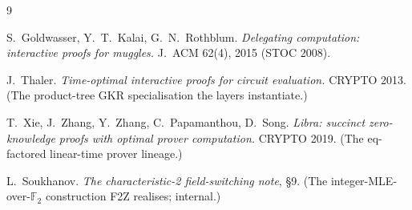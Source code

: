 \documentclass[11pt]{article}
\newcommand{\F}{\mathbb{F}}
\newcommand{\Ftwo}{\F_2}
\theoremstyle{definition}
\begin{document}
\begin{thebibliography}{9}\small

 S.~Goldwasser, Y.~T.~Kalai, G.~N.~Rothblum.
\emph{Delegating computation: interactive proofs for muggles.}
J.~ACM 62(4), 2015 (STOC 2008).

 J.~Thaler.
\emph{Time-optimal interactive proofs for circuit evaluation.}
CRYPTO 2013.  (The product-tree GKR specialisation the layers
instantiate.)

 T.~Xie, J.~Zhang, Y.~Zhang, C.~Papamanthou, D.~Song.
\emph{Libra: succinct zero-knowledge proofs with optimal prover
computation.}  CRYPTO 2019.  (The eq-factored linear-time prover
lineage.)

 L.~Soukhanov.
\emph{The characteristic-2 field-switching note}, \S9.  (The
integer-MLE-over-$\Ftwo$ construction F2Z realises; internal.)

\end{thebibliography}
\end{document}
